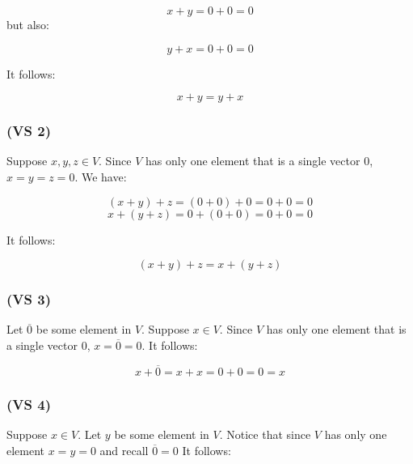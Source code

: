 \documentclass{article}
\begin{document}
\begin{equation*}
    x + y = 0 + 0 = 0
\end{equation*}
but also:

\begin{equation*}
    y + x = 0 + 0 = 0
\end{equation*}

It follows:

\begin{equation*}
    x + y = y + x
\end{equation*}

\subsubsection*{(VS 2)}

Suppose \(x, y, z \in V\). Since \(V\) has only one element
that is a single vector \(0\), \(x = y = z = 0\). We have:

\begin{equation*}
    (x + y) + z = (0 + 0) + 0 = 0 + 0 = 0
\end{equation*}
\begin{equation*}
    x + (y + z) = 0 + (0 + 0) = 0 + 0 = 0
\end{equation*}

It follows:

\begin{equation*}
    (x + y) + z = x + (y + z)
\end{equation*}

\subsubsection*{(VS 3)}

Let \(\overline{0}\) be some element in \(V\). Suppose \(x \in V\). Since \(V\) has only one element
that is a single vector \(0\), \(x = \overline{0} = 0\). It follows:

\begin{equation*}
    x + \overline{0} = x + x = 0 + 0 = 0 = x
\end{equation*}

\subsubsection*{(VS 4)}

Suppose \(x \in V\). Let \(y\) be some element in \(V\). Notice that since \(V\) has only one element
\(x = y = 0\) and recall \(\overline{0} = 0\) It follows:
\end{document}
